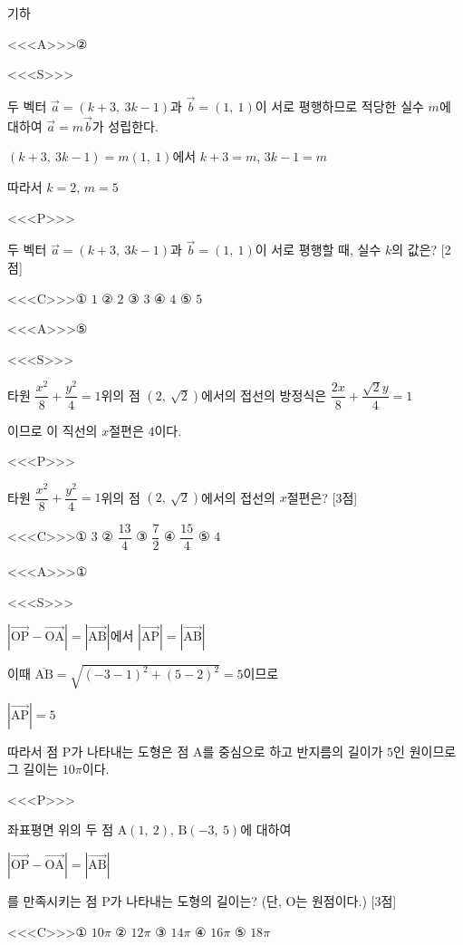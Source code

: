\documentclass{oblivoir}
\begin{document}
기하

<<<A>>>②

<<<S>>>

두 벡터 $\overrightarrow{a}=(k+3,\: 3k-1)$과 $\overrightarrow{b}=(1,\: 1)$이 서로 평행하므로 적당한 실수 $m$에 대하여 $\overrightarrow{a}=m\overrightarrow{b}$가 성립한다.

$(k+3,\: 3k-1)=m(1,\: 1)$에서 $k+3=m$, $3k-1=m$

따라서 $k=2$, $m=5$

<<<P>>>

두 벡터 $\overrightarrow{a}=(k+3,\: 3k-1)$과 $\overrightarrow{b}=(1,\: 1)$이 서로 평행할 때, 실수 $k$의 값은? [2점]

<<<C>>>① $1$ ② $2$ ③ $3$ ④ $4$ ⑤ $5$

<<<A>>>⑤

<<<S>>>

타원 $\dfrac{x^{2}}{8}+\dfrac{y^{2}}{4}=1$위의 점 $(2,\:\sqrt{2})$에서의 접선의 방정식은 $\dfrac{2x}{8}+\dfrac{\sqrt{2}y}{4}=1$

이므로 이 직선의 $x$절편은 $4$이다.

<<<P>>>

타원  $\dfrac{x^{2}}{8}+\dfrac{y^{2}}{4}=1$위의 점 $(2,\:\sqrt{2})$에서의 접선의 $x$절편은? [3점]

<<<C>>>① $3$ ② $\dfrac{13}{4}$ ③ $\dfrac{7}{2}$ ④ $\dfrac{15}{4}$ ⑤ $4$

<<<A>>>①

<<<S>>>

$|\overrightarrow{\mathrm{OP}}-\overrightarrow{\mathrm{OA}}| = |\overrightarrow{\mathrm{AB}}|$에서 $|\overrightarrow{\mathrm{AP}}| = |\overrightarrow{\mathrm{AB}}|$

이때 $\overline{\mathrm{AB}}=\sqrt{(-3-1)^{2}+(5-2)^{2}}=5$이므로

$|\overrightarrow{\mathrm{AP}}| =5$

따라서 점 $\mathrm{P}$가 나타내는 도형은 점 $\mathrm{A}$를 중심으로 하고 반지름의 길이가 $5$인 원이므로 그 길이는 $10\pi$이다.

<<<P>>>

좌표평면 위의 두 점 $\mathrm{A}(1,\: 2)$, $\mathrm{B}(-3,\: 5)$에 대하여 

$|\overrightarrow{\mathrm{OP}}-\overrightarrow{\mathrm{OA}}| = |\overrightarrow{\mathrm{AB}}|$

를 만족시키는 점 $\mathrm{P}$가 나타내는 도형의 길이는? (단, $\mathrm{O}$는 원점이다.) [3점]

<<<C>>>① $10\pi$ ② $12\pi$ ③ $14\pi$ ④ $16\pi$ ⑤ $18\pi$
\end{document}
